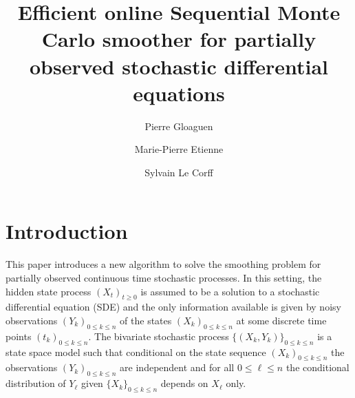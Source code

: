 \documentclass[12pt,draft]{article}
\newcommand{\1}{\mathrm{1}}
\begin{document}
\author{Pierre Gloaguen\footnotemark[1] \and Marie-Pierre Etienne\footnotemark[1] \and Sylvain Le {C}orff\footnotemark[2]}
 


\title{Efficient online Sequential Monte Carlo smoother for partially observed stochastic differential equations}


\maketitle


\section{Introduction}
This paper introduces a new algorithm to solve the smoothing problem for partially observed continuous time stochastic processes. In this setting, the hidden state process $(X_t)_{t\ge 0}$ is assumed to be a solution to a stochastic differential equation (SDE) and the only information available is given by noisy observations $(Y_{k})_{0\le k\le n}$ of the states $(X_k)_{0\le k\le  n}$ at some discrete time points $(t_k)_{0\le k\le n}$. The bivariate stochastic process $\{(X_{k},Y_{k})\}_{0\le k\le n}$ is a state space model such that conditional on the state sequence $(X_{k})_{0\le k\le n}$ the observations $(Y_{k})_{0\le k\le n}$ are independent and for all $0\le \ell\le n$ the conditional distribution of $Y_{\ell}$ given $\{X_{k}\}_{0\le k\le n}$ depends on $X_{\ell}$ only.
\end{document}
